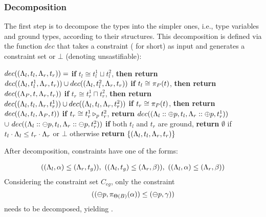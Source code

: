 {{{\subsubsection{\textbf{Decomposition}}
The first step \iffalse to solve the guarded constraints \fi is to decompose the types into the simpler ones, i.e., type variables and ground types, according to their structures.
This decomposition is defined via the function $dec$ that takes a constraint ( for short) as input and generates a constraint set or $\bot$ (denoting unsastifiable):

\begin{algorithmic}
\STATE $dec(\cCondst{\trace_l}{t_l}{\trace_r}{t_r})=$
\STATE \quad \textbf{if} $t_l \cong t_l^1 \sqcup t_l^2$,  \textbf{then return} $dec(\cCondst{\trace_l}{t_l^1}{\trace_r}{t_r}) \cup dec(\cCondst{\trace_l}{t_l^2}{\trace_r}{t_r})$
\STATE \quad \textbf{if} $t_l \cong \app{t}{P}$, \textbf{then return} $dec(\cCondst{\trace_{P}}{t}{\trace_r}{t_r})$
\STATE \quad \textbf{if} $t_r \cong t_r^1 \sqcap t_r^2$,  \textbf{then return} $dec(\cCondst{\trace_l}{t_l}{\trace_r}{t_r^1}) \cup dec(\cCondst{\trace_l}{t_l}{\trace_r}{t_r^2})$
\STATE \quad \textbf{if} $t_r \cong \app{t}{P}$, \textbf{then return} $dec(\cCondst{\trace_l}{t_l}{\trace_{P}}{t})$
\STATE \quad \textbf{if} $t_r \cong \omerge{p}{t_r^1}{t_r^2}$, \textbf{return} $dec(\cCondst{\trace_l::\oplus p}{t_l}{\trace_r::\oplus p}{t_r^1})$
\STATE $\cup ~dec(\cCondst{\trace_l::\ominus p}{t_l}{\trace_r::\ominus p}{t_r^2})$
\STATE \quad \textbf{if} both $t_l$ and $t_r$ are ground, \textbf{return} $\emptyset$ if $t_l\cdot\trace_l \leq t_r\cdot\trace_r$ or $\bot$ otherwise
\STATE  \quad \textbf{return} $\{\cCondst{\trace_l}{t_l}{\trace_r}{t_r}\}$
\end{algorithmic}

After decomposition, constraints have one of the forms:

\begin{align*}
\cCond{\trace_l}{\alpha}{\trace_r}{t_g}, ~\cCond{\trace_l}{t_g}{\trace_r}{\beta}, ~\cCond{\trace_l}{\alpha}{\trace_r}{\beta}
\end{align*}
Considering the constraint set $C_{eg}$, only the constraint
\begin{equation*}
\cCond{\ominus p}{\app{\alpha}{\Theta(B)}}{\ominus p}{\gamma}
\end{equation*}
needs to be decomposed, yielding .


}}}
